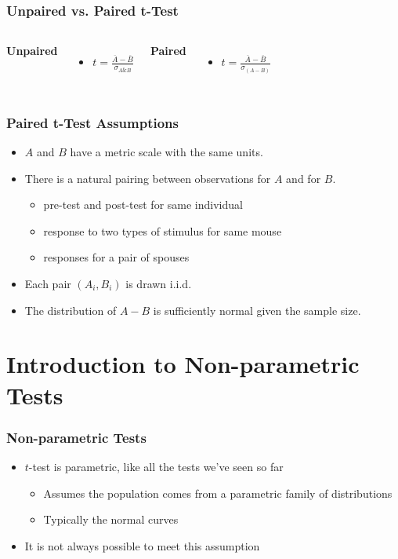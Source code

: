 \documentclass[12pt, block=fill]{beamer}
\begin{document}
\begin{frame}
  \frametitle{Unpaired vs. Paired t-Test}

  \begin{columns}[t]
    \textbf{Unpaired}
    \begin{itemize}
      \item $t = \frac{\overline{A} - \overline{B}} {\sigma_{A\&B}}$
    \end{itemize}
    \textbf{Paired}
    \begin{itemize}
    \item $t = \frac{\overline{A} - \overline{B}}{\sigma_{(A - B)}}$
    \end{itemize}
  \end{columns}

\end{frame}

\begin{frame}
  \frametitle{Paired t-Test Assumptions}

  \begin{itemize}
  \item $A$ and $B$ have a metric scale with the same units.
  \item There is a natural pairing between observations for $A$ and for $B$.
    \begin{itemize}
    \item pre-test and post-test for same individual
    \item response to two types of stimulus for same mouse
    \item responses for a pair of spouses
    \end{itemize}
  \item Each pair $(A_i, B_i)$ is drawn i.i.d.
  \item The distribution of $A-B$ is sufficiently normal given the sample size.

  \end{itemize}
\end{frame}



\section{Introduction to Non-parametric Tests}

\begin{frame}
  \frametitle{Non-parametric Tests}
  
  \begin{itemize}
    \item $t$-test is parametric, like all the tests we've seen so far
    \begin{itemize}
      \item Assumes the population comes from a parametric family of distributions
      \item Typically the normal curves
    \end{itemize}
    \item It is not always possible to meet this assumption
  \end{itemize}
  
\end{frame}
\end{document}
